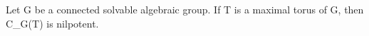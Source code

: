 Let G be a connected solvable algebraic group. If T is a maximal torus of G, then C_G(T) is nilpotent.
